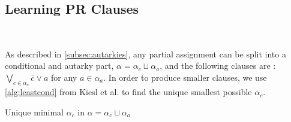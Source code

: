 





\subsection{Learning PR Clauses}~\label{subsec:learning}


As described in \autoref{subsec:autarkies}, any partial assignment can be split 
into a conditional and autarky part, 
$\alpha = \alpha_c \sqcup \alpha_a$, 
and the following clauses are \pr: $\bigvee_{c \in \alpha_c} \overline{c} \lor a$ for
any $a \in \alpha_a$. 
In order to produce smaller \pr clauses, we use 
\autoref{alg:leastcond} from Kiesl et al.
\cite{conditionalautarkies} to find the unique smallest possible $\alpha_c$.



\begin{algorithm}
    \caption{Unique minimal $\alpha_c$ in $\alpha = \alpha_c \sqcup \alpha_a$}\label{alg:leastcond}
    \SetAlgoNoLine

\end{algorithm}

